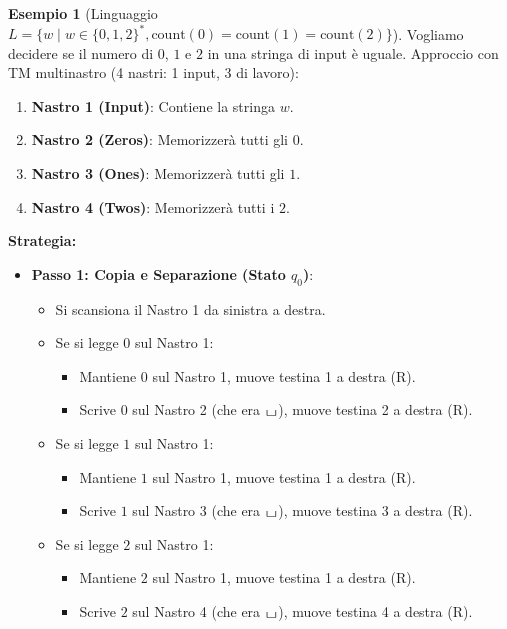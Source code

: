 \documentclass[a4paper]{article}
\theoremstyle{definition} %
\newtheorem{example}{Esempio}
\newcommand{\blankS}{\ensuremath{\raisebox{-0.15ex}{\scalebox{1.3}[0.7]{$\sqcup$}}}}
\begin{document}
\begin{example}[Linguaggio $L = \{w \mid w \in \{0,1,2\}^*, \text{count}(0)=\text{count}(1)=\text{count}(2)\}$]
Vogliamo decidere se il numero di $0$, $1$ e $2$ in una stringa di input è uguale.
Approccio con TM multinastro (4 nastri: 1 input, 3 di lavoro):
\begin{enumerate}
    \item \textbf{Nastro 1 (Input)}: Contiene la stringa $w$.
    \item \textbf{Nastro 2 (Zeros)}: Memorizzerà tutti gli $0$.
    \item \textbf{Nastro 3 (Ones)}: Memorizzerà tutti gli $1$.
    \item \textbf{Nastro 4 (Twos)}: Memorizzerà tutti i $2$.
\end{enumerate}
\textbf{Strategia:}
\begin{itemize}
    \item \textbf{Passo 1: Copia e Separazione (Stato $q_0$)}:
        \begin{itemize}
            \item Si scansiona il Nastro 1 da sinistra a destra.
            \item Se si legge $0$ sul Nastro 1:
                \begin{itemize}
                    \item Mantiene $0$ sul Nastro 1, muove testina 1 a destra (R).
                    \item Scrive $0$ sul Nastro 2 (che era $\blankS$), muove testina 2 a destra (R).
                \end{itemize}
            \item Se si legge $1$ sul Nastro 1:
                \begin{itemize}
                    \item Mantiene $1$ sul Nastro 1, muove testina 1 a destra (R).
                    \item Scrive $1$ sul Nastro 3 (che era $\blankS$), muove testina 3 a destra (R).
                \end{itemize}
            \item Se si legge $2$ sul Nastro 1:
                \begin{itemize}
                    \item Mantiene $2$ sul Nastro 1, muove testina 1 a destra (R).
                    \item Scrive $2$ sul Nastro 4 (che era $\blankS$), muove testina 4 a destra (R).
                \end{itemize}

\end{itemize}
\end{itemize}
\end{example}
\end{document}
